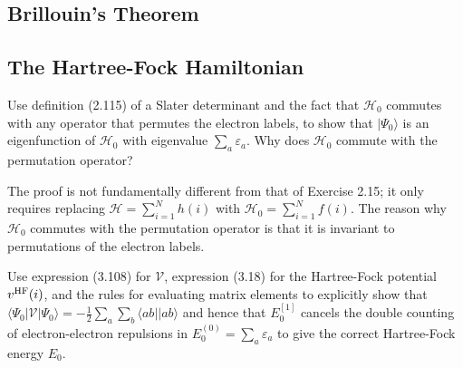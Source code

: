 \documentclass[a4paper]{book}
\newcounter{exercise}[chapter]
\newcounter{solution}[chapter]
\newcommand{\HF}{{\rm HF}}
\begin{document}
	\subsection{Brillouin's Theorem}
	
	\subsection{The Hartree-Fock Hamiltonian}
	
	\begin{exercise}
	Use definition (2.115) of a Slater determinant and the fact that $\mathscr{H}_0$ commutes with any operator that permutes the electron labels, to show that $|\Psi_0\rangle$ is an eigenfunction of $\mathscr{H}_0$ with eigenvalue $\displaystyle \sum_a \varepsilon_a$. Why does $\mathscr{H}_0$ commute with the permutation operator?
	\end{exercise}
	
	\begin{solution}
	
	The proof is not fundamentally different from that of Exercise 2.15; it only requires replacing $\mathscr{H} = \sum_{i=1}^N h(i)$ with $\mathscr{H}_0 = \sum_{i=1}^N f(i)$. The reason why $\mathscr{H}_0$ commutes with the permutation operator is that it is invariant to permutations of the electron labels.
	
	\end{solution}
	
	\begin{exercise}
	Use expression (3.108) for $\mathscr{V}$, expression (3.18) for the Hartree-Fock potential $v^{\HF}(i)$, and the rules for evaluating matrix elements to explicitly show that $\displaystyle \langle \Psi_0 | \mathscr{V} | \Psi_0 \rangle = -\frac{1}{2} \sum_a \sum_b \langle ab || ab \rangle$ and hence that $E^{[1]}_0$ cancels the double counting of electron-electron repulsions in $\displaystyle E^{(0)}_0=\sum_a \varepsilon_a$ to give the correct Hartree-Fock energy $E_0$.
	\end{exercise}
	
\end{document}
